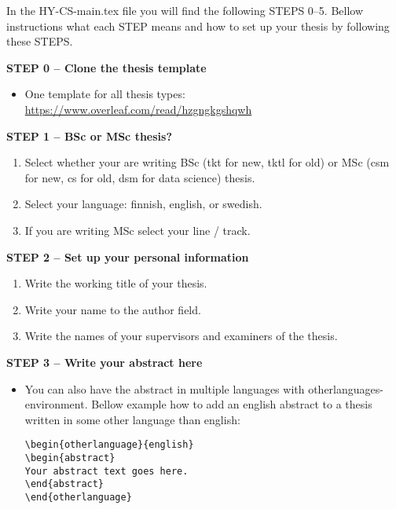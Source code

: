


In the HY-CS-main.tex file you will find the following STEPS 0--5. Bellow instructions what each STEP means and how to set up your thesis by following these STEPS.
\vspace{0.5cm}

\textbf{STEP 0 -- Clone the thesis template}

\begin{itemize}
\item One template for all thesis types: \url{https://www.overleaf.com/read/hzgngkgshqwh}
\end{itemize}


{\textbf{STEP 1 -- BSc or MSc thesis?}}
\begin{enumerate}
\item Select whether your are writing BSc (tkt for new, tktl for old) or MSc (csm for new, cs for old, dsm for data science) thesis.
\item Select your language: finnish, english, or swedish.
\item If you are writing MSc select your line / track.
\end{enumerate}


{\textbf{STEP 2 -- Set up your personal information}}

\begin{enumerate}
\item Write the working title of your thesis.
\item Write your name to the author field.
\item Write the names of your supervisors and examiners of the thesis.
\end{enumerate}

{\textbf{STEP 3 -- Write your abstract here}}

\begin{itemize}
\item You can also have the abstract in multiple languages with otherlanguages-environment. Bellow example how to add an english abstract to a thesis written in some other language than english: 

\begin{verbatim}
\begin{otherlanguage}{english} 
\begin{abstract}
Your abstract text goes here. 
\end{abstract} 
\end{otherlanguage}
\end{verbatim}

\end{itemize}

